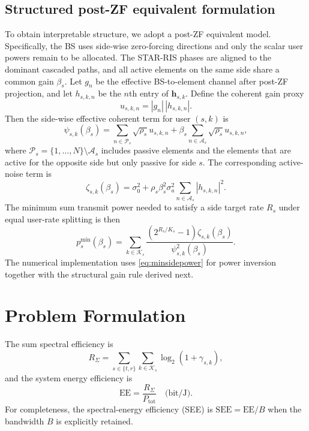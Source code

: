 \documentclass[journal]{IEEEtran}
\begin{document}
\subsection{Structured post-ZF equivalent formulation}
To obtain interpretable structure, we adopt a post-ZF equivalent model. Specifically, the BS uses side-wise zero-forcing directions and only the scalar user powers remain to be allocated. The STAR-RIS phases are aligned to the dominant cascaded paths, and all active elements on the same side share a common gain $\beta_s$. Let $g_n$ be the effective BS-to-element channel after post-ZF projection, and let $h_{s,k,n}$ be the $n$th entry of $\mathbf{h}_{s,k}$. Define the coherent gain proxy
\begin{equation}
u_{s,k,n} = |g_n|\,|h_{s,k,n}|.
\label{eq:un}
\end{equation}
Then the side-wise effective coherent term for user $(s,k)$ is
\begin{equation}
\psi_{s,k}(\beta_s)=
\sum_{n\in\mathcal{P}_s}\sqrt{\rho_s}u_{s,k,n}
+\beta_s\sum_{n\in\mathcal{A}_s}\sqrt{\rho_s}u_{s,k,n},
\label{eq:psi}
\end{equation}
where $\mathcal{P}_s=\{1,\ldots,N\}\setminus\mathcal{A}_s$ includes passive elements and the elements that are active for the opposite side but only passive for side $s$. The corresponding active-noise term is
\begin{equation}
\zeta_{s,k}(\beta_s)=\sigma_0^2+
\rho_s\beta_s^2\sigma_a^2
\sum_{n\in\mathcal{A}_s}|h_{s,k,n}|^2.
\label{eq:noise_exact}
\end{equation}
The minimum sum transmit power needed to satisfy a side target rate $R_s$ under equal user-rate splitting is then
\begin{equation}
p_s^{\min}(\beta_s)=
\sum_{k\in\mathcal{K}_s}
\frac{(2^{R_s/K_s}-1)\zeta_{s,k}(\beta_s)}{\psi_{s,k}^2(\beta_s)}.
\label{eq:minsidepower}
\end{equation}
The numerical implementation uses \eqref{eq:minsidepower} for power inversion together with the structural gain rule derived next.

\section{Problem Formulation}
The sum spectral efficiency is
\begin{equation}
R_\Sigma = \sum_{s\in\{t,r\}}\sum_{k\in\mathcal{K}_s}\log_2(1+\gamma_{s,k}),
\label{eq:sumrate}
\end{equation}
and the system energy efficiency is
\begin{equation}
\mathrm{EE} = \frac{R_\Sigma}{P_{\mathrm{tot}}}\quad \text{(bit/J)}.
\label{eq:ee}
\end{equation}
For completeness, the spectral-energy efficiency (SEE) is $\mathrm{SEE}=\mathrm{EE}/B$ when the bandwidth $B$ is explicitly retained.
\end{document}

